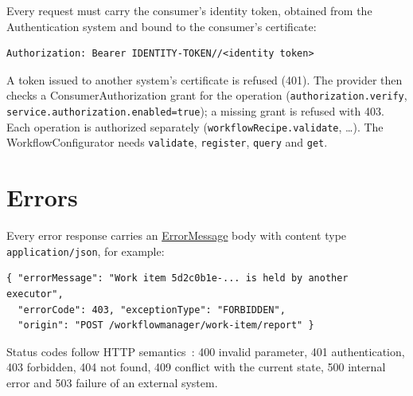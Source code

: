 \documentclass[a4paper]{arrowhead}
\newcommand{\mref}[1]{{\textcolor{ArrowheadPurple}{\hyperref[sec:model:#1]{#1}}}}
\begin{document}
Every request must carry the consumer's identity token, obtained from the Authentication system and bound to the
consumer's certificate:
\begin{lstlisting}
Authorization: Bearer IDENTITY-TOKEN//<identity token>
\end{lstlisting}
A token issued to another system's certificate is refused (401). The provider then checks a ConsumerAuthorization
grant for the operation (\texttt{authorization.\allowbreak{}verify}, \texttt{service.\allowbreak{}authorization.\allowbreak{}enabled=\allowbreak{}true}); a missing grant is
refused with 403. Each operation is authorized separately (\texttt{workflow\allowbreak{}Recipe.\allowbreak{}validate}, \ldots). The WorkflowConfigurator needs \texttt{validate}, \texttt{register}, \texttt{query} and \texttt{get}.


\section{Errors}
\label{sec:errors}
Every error response carries an \mref{ErrorMessage} body with content type \texttt{application/\allowbreak{}json}, for example:
\begin{lstlisting}
{ "errorMessage": "Work item 5d2c0b1e-... is held by another executor",
  "errorCode": 403, "exceptionType": "FORBIDDEN",
  "origin": "POST /workflowmanager/work-item/report" }
\end{lstlisting}
Status codes follow HTTP semantics~\cite{rfc9110}: 400 invalid parameter, 401 authentication, 403 forbidden, 404 not
found, 409 conflict with the current state, 500 internal error and 503 failure of an external system.
\end{document}
